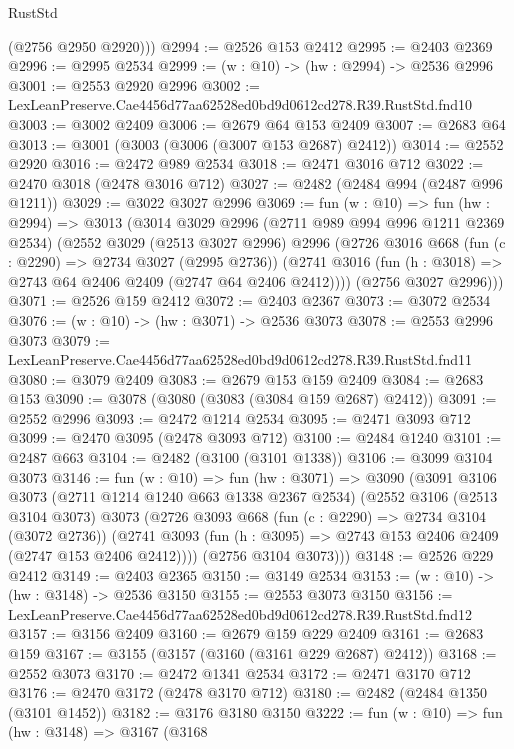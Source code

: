 \begin{lexlean}{RustStd}
\begin{coremodule}
        (@2756 @2950 @2920)))
@2994 := @2526 @153 @2412
@2995 := @2403 @2369
@2996 := @2995 @2534
@2999 := (w : @10) -> (hw : @2994) -> @2536 @2996
@3001 := @2553 @2920 @2996
@3002 := LexLeanPreserve.Cae4456d77aa62528ed0bd9d0612cd278.R39.RustStd.fnd10
@3003 := @3002 @2409
@3006 := @2679 @64 @153 @2409
@3007 := @2683 @64
@3013 := @3001 (@3003 (@3006 (@3007 @153 @2687) @2412))
@3014 := @2552 @2920
@3016 := @2472 @989 @2534
@3018 := @2471 @3016 @712
@3022 := @2470 @3018 (@2478 @3016 @712)
@3027 := @2482 (@2484 @994 (@2487 @996 @1211))
@3029 := @3022 @3027 @2996
@3069 := fun (w : @10) =>
  fun (hw : @2994) =>
  @3013
    (@3014
      @3029
      @2996
      (@2711 @989 @994 @996 @1211 @2369 @2534)
      (@2552
        @3029
        (@2513 @3027 @2996)
        @2996
        (@2726
          @3016
          @668
          (fun (c : @2290) => @2734 @3027 (@2995 @2736))
          (@2741 @3016 (fun (h : @3018) => @2743 @64 @2406 @2409 (@2747 @64 @2406 @2412))))
        (@2756 @3027 @2996)))
@3071 := @2526 @159 @2412
@3072 := @2403 @2367
@3073 := @3072 @2534
@3076 := (w : @10) -> (hw : @3071) -> @2536 @3073
@3078 := @2553 @2996 @3073
@3079 := LexLeanPreserve.Cae4456d77aa62528ed0bd9d0612cd278.R39.RustStd.fnd11
@3080 := @3079 @2409
@3083 := @2679 @153 @159 @2409
@3084 := @2683 @153
@3090 := @3078 (@3080 (@3083 (@3084 @159 @2687) @2412))
@3091 := @2552 @2996
@3093 := @2472 @1214 @2534
@3095 := @2471 @3093 @712
@3099 := @2470 @3095 (@2478 @3093 @712)
@3100 := @2484 @1240
@3101 := @2487 @663
@3104 := @2482 (@3100 (@3101 @1338))
@3106 := @3099 @3104 @3073
@3146 := fun (w : @10) =>
  fun (hw : @3071) =>
  @3090
    (@3091
      @3106
      @3073
      (@2711 @1214 @1240 @663 @1338 @2367 @2534)
      (@2552
        @3106
        (@2513 @3104 @3073)
        @3073
        (@2726
          @3093
          @668
          (fun (c : @2290) => @2734 @3104 (@3072 @2736))
          (@2741 @3093 (fun (h : @3095) => @2743 @153 @2406 @2409 (@2747 @153 @2406 @2412))))
        (@2756 @3104 @3073)))
@3148 := @2526 @229 @2412
@3149 := @2403 @2365
@3150 := @3149 @2534
@3153 := (w : @10) -> (hw : @3148) -> @2536 @3150
@3155 := @2553 @3073 @3150
@3156 := LexLeanPreserve.Cae4456d77aa62528ed0bd9d0612cd278.R39.RustStd.fnd12
@3157 := @3156 @2409
@3160 := @2679 @159 @229 @2409
@3161 := @2683 @159
@3167 := @3155 (@3157 (@3160 (@3161 @229 @2687) @2412))
@3168 := @2552 @3073
@3170 := @2472 @1341 @2534
@3172 := @2471 @3170 @712
@3176 := @2470 @3172 (@2478 @3170 @712)
@3180 := @2482 (@2484 @1350 (@3101 @1452))
@3182 := @3176 @3180 @3150
@3222 := fun (w : @10) =>
  fun (hw : @3148) =>
  @3167
    (@3168

\end{coremodule}
\end{lexlean}
